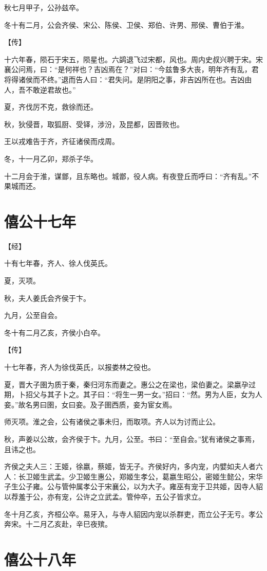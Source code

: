 \documentclass[a4paper,12pt,UTF8,twoside]{ctexbook}
\begin{document}
秋七月甲子，公孙兹卒。

冬十有二月，公会齐侯、宋公、陈侯、卫侯、郑伯、许男、邢侯、曹伯于淮。

【传】

十六年春，陨石于宋五，陨星也。六鹢退飞过宋都，风也。周内史叔兴聘于宋。宋襄公问焉，曰：“是何祥也？吉凶焉在？”对曰：“今兹鲁多大丧，明年齐有乱，君将得诸侯而不终。”退而告人曰：“君失问。是阴阳之事，非吉凶所在也。吉凶由人，吾不敢逆君故也。”

夏，齐伐厉不克，救徐而还。

秋，狄侵晋，取狐厨、受铎，涉汾，及昆都，因晋败也。

王以戎难告于齐，齐征诸侯而戍周。

冬，十一月乙卯，郑杀子华。

十二月会于淮，谋鄫，且东略也。城鄫，役人病。有夜登丘而呼曰：“齐有乱。”不果城而还。


\chapter{僖公十七年}


【经】

十有七年春，齐人、徐人伐英氏。

夏，灭项。

秋，夫人姜氏会齐侯于卞。

九月，公至自会。

冬十有二月乙亥，齐侯小白卒。

【传】

十七年春，齐人为徐伐英氏，以报娄林之役也。

夏，晋大子圉为质于秦，秦归河东而妻之。惠公之在梁也，梁伯妻之。梁嬴孕过期，卜招父与其子卜之。其子曰：“将生一男一女。”招曰：“然。男为人臣，女为人妾。”故名男曰圉，女曰妾。及子圉西质，妾为宦女焉。

师灭项。淮之会，公有诸侯之事未归，而取项。齐人以为讨而止公。

秋，声姜以公故，会齐侯于卞。九月，公至。书曰：“至自会。”犹有诸侯之事焉，且讳之也。

齐侯之夫人三：王姬，徐嬴，蔡姬，皆无子。齐侯好内，多内宠，内嬖如夫人者六人：长卫姬生武孟。少卫姬生惠公，郑姬生孝公，葛嬴生昭公，密姬生懿公，宋华子生公子雍。公与管仲属孝公于宋襄公，以为大子。雍巫有宠于卫共姬，因寺人貂以荐羞于公，亦有宠，公许之立武孟。管仲卒，五公子皆求立。

冬十月乙亥，齐桓公卒。易牙入，与寺人貂因内宠以杀群吏，而立公子无亏。孝公奔宋。十二月乙亥赴，辛巳夜殡。

\chapter{僖公十八年}
\end{document}
